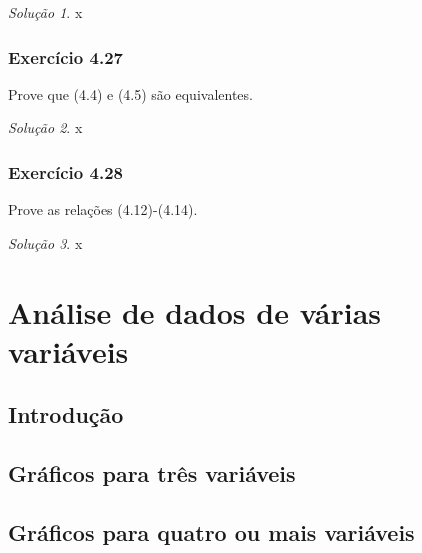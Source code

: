 \documentclass[
]{latex/krantz}
\theoremstyle{definition}
\theoremstyle{definition}
\theoremstyle{definition}
\theoremstyle{definition}
\theoremstyle{remark}
\newtheorem*{solution}{Solução}
\begin{document}
\begin{solution}
x
\end{solution}

\hypertarget{exr4-27}{%
\subsection*{Exercício 4.27}\label{exr4-27}}

Prove que (4.4) e (4.5) são equivalentes.

\begin{solution}
x
\end{solution}

\hypertarget{exr4-28}{%
\subsection*{Exercício 4.28}\label{exr4-28}}

Prove as relações (4.12)-(4.14).

\begin{solution}
x
\end{solution}

\hypertarget{anuxe1lise-de-dados-de-vuxe1rias-variuxe1veis}{%
\chapter{Análise de dados de várias variáveis}\label{anuxe1lise-de-dados-de-vuxe1rias-variuxe1veis}}

\hypertarget{introduuxe7uxe3o-3}{%
\section{Introdução}\label{introduuxe7uxe3o-3}}

\hypertarget{gruxe1ficos-para-truxeas-variuxe1veis}{%
\section{Gráficos para três variáveis}\label{gruxe1ficos-para-truxeas-variuxe1veis}}

\hypertarget{gruxe1ficos-para-quatro-ou-mais-variuxe1veis}{%
\section{Gráficos para quatro ou mais variáveis}\label{gruxe1ficos-para-quatro-ou-mais-variuxe1veis}}
\end{document}
